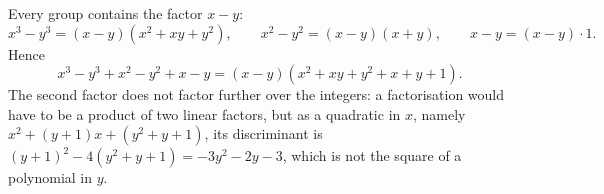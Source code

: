 Every group contains the factor $x-y$:
\[
x^3-y^3=(x-y)(x^2+xy+y^2),\qquad x^2-y^2=(x-y)(x+y),\qquad x-y=(x-y)\cdot 1 .
\]
Hence
\[
x^3-y^3+x^2-y^2+x-y=\boxed{(x-y)\left(x^2+xy+y^2+x+y+1\right)} .
\]
The second factor does not factor further over the integers: a factorisation would have to be a product of two linear factors, but as a quadratic in $x$, namely $x^2+(y+1)x+(y^2+y+1)$, its discriminant is $(y+1)^2-4(y^2+y+1)=-3y^2-2y-3$, which is not the square of a polynomial in $y$.
